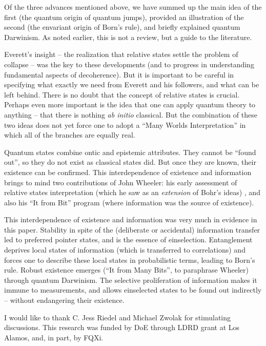 \documentclass[aps,amsmath,amssymb,amsfonts,12pt]{revtex4-1}
\newcommand{\+}         {\dagger}
\begin{document}
{{{Of the three advances mentioned above, we have summed up the main idea of the first (the quantum origin
of quantum jumps), provided an illustration of the second (the envariant origin of Born's rule), and briefly
explained quantum Darwinism. As noted earlier, this is not
a review, but a guide to the literature.

Everett's insight -- the realization that relative states settle the problem of collapse -- was the key to these
developments (and to progress in understanding fundamental aspects of decoherence). But it is important to
be careful in specifying what exactly we need from Everett and his followers, and what can
be left behind. There is no doubt that the concept of relative states is crucial. Perhaps even more
important is the idea that one can apply quantum theory to anything -- that there is nothing {\it ab initio}
classical. But the combination of these two ideas does not yet force one to adopt a
``Many Worlds Interpretation'' in which all of the branches are equally real.

Quantum states combine ontic and epistemic attributes. They cannot be ``found out'', so they do not
exist as classical states did. But once they are known, their existence can be confirmed.
This interdependence of existence and information brings to mind two contributions of
John Wheeler:  his early assessment of relative states interpretation (which he saw as
an {\it extension} of Bohr's ideas) \cite{JAW}, and also his ``It from Bit'' program \cite{63} (where information was
the source of existence).

This interdependence of existence and information was very much in evidence in this paper.  Stability
in spite of the (deliberate or accidental) information transfer led to preferred pointer states, and is the
essence of einselection. Entanglement deprives local states of information (which is transferred
to correlations) and forces one to describe these local states in probabilistic terms, leading to Born's
rule. Robust existence emerges (``It from Many Bits'', to paraphrase Wheeler) through quantum Darwinism.  The selective proliferation
of information makes it immune to measurements, and allows einselected states to be
found out indirectly -- without endangering their existence.

I would like to thank C. Jess Riedel and
Michael Zwolak for stimulating discussions. This research was
funded by DoE through LDRD grant at Los Alamos, and, in part, by FQXi.

}}}
\end{document}
